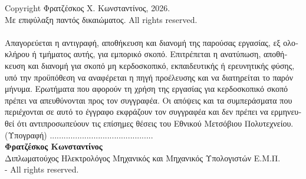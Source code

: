 \newpage
\noindent Copyright \textcopyright \textgreek{ Φρατζέσκος Χ. Κωνσταντίνος, 2026.}\\
\textgreek{Με επιφύλαξη παντός δικαιώματος.} All rights reserved.\\ \\ \textgreek{
Απαγορεύεται η αντιγραφή, αποθήκευση και διανομή της παρούσας εργασίας, εξ ολοκλήρου ή τμήματος αυτής, για εμπορικό σκοπό.  Επιτρέπεται η ανατύπωση, αποθήκευση και διανομή για σκοπό μη κερδοσκοπικό, εκπαιδευτικής ή ερευνητικής φύσης, υπό την προϋπόθεση να αναφέρεται η πηγή προέλευσης και να διατηρείται το παρόν μήνυμα.  Ερωτήματα που αφορούν τη χρήση της εργασίας για κερδοσκοπικό σκοπό πρέπει να απευθύνονται προς τον συγγραφέα.
Οι απόψεις και τα συμπεράσματα που περιέχονται σε αυτό το έγγραφο εκφράζουν τον συγγραφέα και δεν πρέπει να ερμηνευθεί ότι αντιπροσωπεύουν τις επίσημες θέσεις του Εθνικού Μετσόβιου Πολυτεχνείου.}
\linebreak \linebreak \linebreak \linebreak \linebreak \linebreak \linebreak \linebreak \linebreak \linebreak
\noindent
\textgreek{(Υπογραφή)}
\linebreak \linebreak \linebreak \linebreak \linebreak
.............................................\\
\large {\textbf{\textgreek{Φρατζέσκος Κωνσταντίνος}}}\\
\textgreek{Διπλωματούχος Ηλεκτρολόγος Μηχανικός και Μηχανικός Υπολογιστών Ε.Μ.Π.}\\
 - All rights reserved.


%
